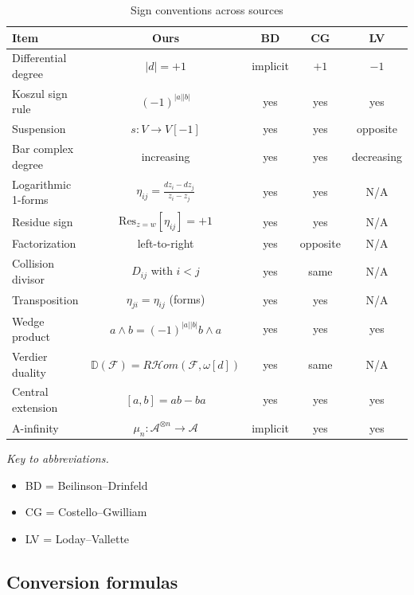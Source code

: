 \begin{table}[ht!]
\centering
\caption{Sign conventions across sources}
\label{tab:sign-conventions-complete}
\small
\begin{tabular}{|l|c|c|c|c|}
\hline
\textbf{Item} & \textbf{Ours} & \textbf{BD} & \textbf{CG} & \textbf{LV} \\
\hline
\hline
Differential degree & $|d| = +1$ & implicit & $+1$ & $-1$ \\
Koszul sign rule & $(-1)^{|a||b|}$ & yes & yes & yes \\
Suspension & $s: V \to V[-1]$ & yes & yes & opposite \\
Bar complex degree & increasing & yes & yes & decreasing \\
Logarithmic 1-forms & $\eta_{ij} = \frac{dz_i - dz_j}{z_i - z_j}$ & yes & yes & N/A \\
Residue sign & $\text{Res}_{z=w}[\eta_{ij}] = +1$ & yes & yes & N/A \\
Factorization & left-to-right & yes & opposite & N/A \\
Collision divisor & $D_{ij}$ with $i < j$ & yes & same & N/A \\
Transposition & $\eta_{ji} = \eta_{ij}$ (forms) & yes & yes & N/A \\
Wedge product & $a \wedge b = (-1)^{|a||b|} b \wedge a$ & yes & yes & yes \\
Verdier duality & $\mathbb{D}(\mathcal{F}) = R\mathcal{H}om(\mathcal{F}, \omega[d])$ & yes & same & N/A \\
Central extension & $[a,b] = ab - ba$ & yes & yes & yes \\
A-infinity & $\mu_n: \mathcal{A}^{\otimes n} \to \mathcal{A}$ & implicit & yes & yes \\
\hline
\end{tabular}
\end{table}

\emph{Key to abbreviations.}
\begin{itemize}
\item BD = Beilinson--Drinfeld \cite{BD04}
\item CG = Costello--Gwilliam \cite{CG17}
\item LV = Loday--Vallette \cite{LV12}
\end{itemize}

\subsection{Conversion formulas}


